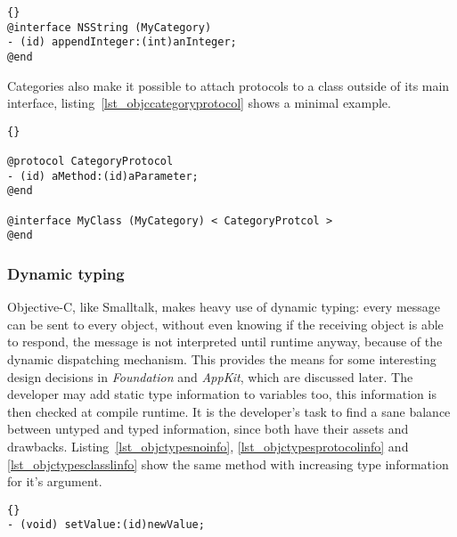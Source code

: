 \begin{lstlisting}[captionpos=b, caption=An Objective-C category added to the
NSString class., label=lst_objccategory]{}
@interface NSString (MyCategory)
- (id) appendInteger:(int)anInteger;
@end
\end{lstlisting}

Categories also make it possible to attach protocols to a class outside of its
main interface, listing~\ref{lst_objccategoryprotocol} shows a minimal example.

\begin{lstlisting}[captionpos=b, caption=Attaching a protocol to an existing
class by the means of a category., label=lst_objccategoryprotocol]{}

@protocol CategoryProtocol
- (id) aMethod:(id)aParameter;
@end

@interface MyClass (MyCategory) < CategoryProtcol >
@end

\end{lstlisting}

\subsubsection{Dynamic typing}
Objective-C, like Smalltalk, makes heavy use of dynamic typing: every message
can be sent to every object, without even knowing if the receiving object is
able to respond, the message is not interpreted until runtime anyway, because
of the dynamic dispatching mechanism. This provides the means for some
interesting design decisions in \textit{Foundation} and \textit{AppKit}, which
are discussed later. 
The developer may add static type information to variables too, this
information is then checked at compile runtime. It is the developer's task to
find a sane balance between untyped and typed information, since both have their
assets and drawbacks. Listing~\ref{lst_objctypesnoinfo},
\ref{lst_objctypesprotocolinfo} and \ref{lst_objctypesclasslinfo} show the same
method with increasing type information for it's argument.

\begin{lstlisting}[captionpos=b, caption=Argument without type information.,
label=lst_objctypesnoinfo]{}
- (void) setValue:(id)newValue;
\end{lstlisting}


